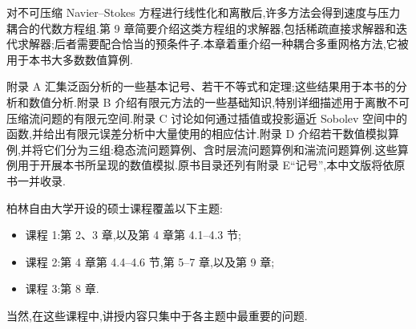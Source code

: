 对不可压缩 Navier--Stokes 方程进行线性化和离散后,许多方法会得到速度与压力耦合的代数方程组.第 9 章简要介绍这类方程组的求解器,包括稀疏直接求解器和迭代求解器;后者需要配合恰当的预条件子.本章着重介绍一种耦合多重网格方法,它被用于本书大多数数值算例.

附录 A 汇集泛函分析的一些基本记号、若干不等式和定理;这些结果用于本书的分析和数值分析.附录 B 介绍有限元方法的一些基础知识,特别详细描述用于离散不可压缩流问题的有限元空间.附录 C 讨论如何通过插值或投影逼近 Sobolev 空间中的函数,并给出有限元误差分析中大量使用的相应估计.附录 D 介绍若干数值模拟算例,并将它们分为三组:稳态流问题算例、含时层流问题算例和湍流问题算例.这些算例用于开展本书所呈现的数值模拟.原书目录还列有附录 E“记号”,本中文版将依原书一并收录.

柏林自由大学开设的硕士课程覆盖以下主题:
\begin{itemize}
  \item 课程 1:第 2、3 章,以及第 4 章第 4.1--4.3 节;
  \item 课程 2:第 4 章第 4.4--4.6 节,第 5--7 章,以及第 9 章;
  \item 课程 3:第 8 章.
\end{itemize}
当然,在这些课程中,讲授内容只集中于各主题中最重要的问题.
